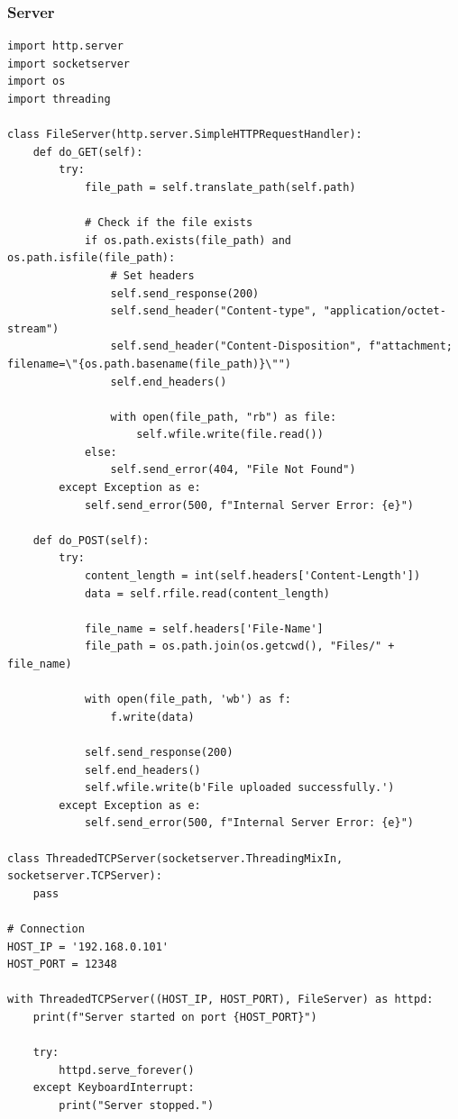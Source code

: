 \documentclass[11pt]{article}
\begin{document}
\subsubsection*{Server}
\begin{verbatim}
import http.server
import socketserver
import os
import threading

class FileServer(http.server.SimpleHTTPRequestHandler):
    def do_GET(self):
        try:
            file_path = self.translate_path(self.path)
            
            # Check if the file exists
            if os.path.exists(file_path) and os.path.isfile(file_path):
                # Set headers
                self.send_response(200)
                self.send_header("Content-type", "application/octet-stream")
                self.send_header("Content-Disposition", f"attachment; filename=\"{os.path.basename(file_path)}\"")
                self.end_headers()
                
                with open(file_path, "rb") as file:
                    self.wfile.write(file.read())
            else:
                self.send_error(404, "File Not Found")
        except Exception as e:
            self.send_error(500, f"Internal Server Error: {e}")
            
    def do_POST(self):
        try:
            content_length = int(self.headers['Content-Length'])
            data = self.rfile.read(content_length)
            
            file_name = self.headers['File-Name']
            file_path = os.path.join(os.getcwd(), "Files/" + file_name)
            
            with open(file_path, 'wb') as f:
                f.write(data)
            
            self.send_response(200)
            self.end_headers()
            self.wfile.write(b'File uploaded successfully.')
        except Exception as e:
            self.send_error(500, f"Internal Server Error: {e}")

class ThreadedTCPServer(socketserver.ThreadingMixIn, socketserver.TCPServer):
    pass

# Connection
HOST_IP = '192.168.0.101'
HOST_PORT = 12348

with ThreadedTCPServer((HOST_IP, HOST_PORT), FileServer) as httpd:
    print(f"Server started on port {HOST_PORT}")
    
    try:
        httpd.serve_forever()
    except KeyboardInterrupt:
        print("Server stopped.")

\end{verbatim}
\end{document}
